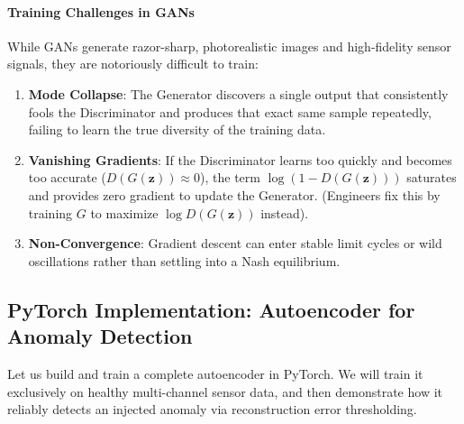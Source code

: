 \paragraph{Training Challenges in GANs}
While GANs generate razor-sharp, photorealistic images and high-fidelity sensor signals, they are notoriously difficult to train:
\begin{enumerate}
    \item \textbf{Mode Collapse}: The Generator discovers a single output that consistently fools the Discriminator and produces that exact same sample repeatedly, failing to learn the true diversity of the training data.
    \item \textbf{Vanishing Gradients}: If the Discriminator learns too quickly and becomes too accurate ($D(G(\mathbf{z})) \approx 0$), the term $\log(1 - D(G(\mathbf{z})))$ saturates and provides zero gradient to update the Generator. (Engineers fix this by training $G$ to maximize $\log D(G(\mathbf{z}))$ instead).
    \item \textbf{Non-Convergence}: Gradient descent can enter stable limit cycles or wild oscillations rather than settling into a Nash equilibrium.
\end{enumerate}

\subsection{PyTorch Implementation: Autoencoder for Anomaly Detection}\label{subsec:pytorch_autoencoder}

Let us build and train a complete autoencoder in PyTorch. We will train it exclusively on healthy multi-channel sensor data, and then demonstrate how it reliably detects an injected anomaly via reconstruction error thresholding.

